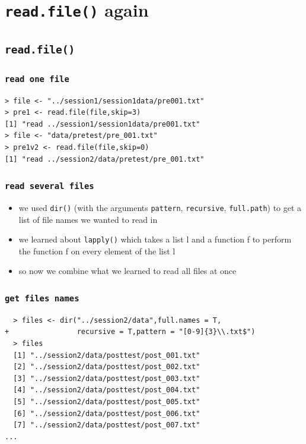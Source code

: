 \documentclass[xcolor={table},c]{beamer}
\begin{document}
\section{\texttt{read.file()} again}
\subsection{\texttt{read.file()}}
\begin{frame}[fragile]\frametitle{\texttt{read one file}}
\begin{verbatim}
> file <- "../session1/session1data/pre001.txt"
> pre1 <- read.file(file,skip=3)
[1] "read ../session1/session1data/pre001.txt"
> file <- "data/pretest/pre_001.txt"
> pre1v2 <- read.file(file,skip=0)
[1] "read ../session2/data/pretest/pre_001.txt"
\end{verbatim}
\end{frame}


\begin{frame}[fragile]\frametitle{\texttt{read several files}}
  \begin{itemize}
  \item we used \texttt{dir()} (with the arguments \texttt{pattern}, \texttt{recursive}, \texttt{full.path}) to get a list of file names we wanted to read in 
  \item we learned about \texttt{lapply()} which takes a list l and a function f to perform the function f on every element of the list l
  \item so now we combine what we learned to read all files at once
  \end{itemize}
\end{frame}


\begin{frame}[fragile]\frametitle{\texttt{get files names}}
\begin{verbatim}
  > files <- dir("../session2/data",full.names = T, 
+                recursive = T,pattern = "[0-9]{3}\\.txt$")
  > files
  [1] "../session2/data/posttest/post_001.txt"   
  [2] "../session2/data/posttest/post_002.txt"   
  [3] "../session2/data/posttest/post_003.txt"   
  [4] "../session2/data/posttest/post_004.txt"   
  [5] "../session2/data/posttest/post_005.txt"   
  [6] "../session2/data/posttest/post_006.txt"   
  [7] "../session2/data/posttest/post_007.txt"   
...
\end{verbatim}
\end{frame}
\end{document}
